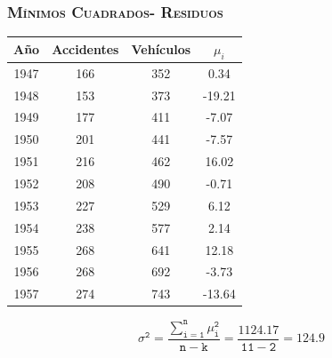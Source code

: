 \documentclass[16.5pt]{beamer}
\begin{document}
{
\begin{frame}
\frametitle{\textsc{Mínimos Cuadrados- Residuos}}
\hspace*{-5mm}
\vspace*{-5mm} 


\begin{center}
\begin{tabular}{| c |c |c|c|}
\hline%
  \textbf{Año} & \textbf{Accidentes} & \textbf{Vehículos}  & \textbf{$\mu_i$} 
 \tabularnewline
\hline
1947 & 166 &  352  & 0.34 \\
1948 & 153 & 373 & -19.21 \\
1949 & 177 & 411 & -7.07 \\
1950 & 201 & 441 & -7.57 \\
1951 & 216 & 462 & 16.02 \\
1952 & 208 & 490 & -0.71 \\
1953 & 227 & 529 & 6.12 \\
1954 & 238 & 577 & 2.14 \\
1955 & 268 & 641 & 12.18  \\
1956 & 268 & 692 & -3.73 \\
1957 & 274 & 743 & -13.64 \\
\hline
\end{tabular}
\end{center}
$$\mathtt{ \sigma^2 = \frac{\sum_{i=1}^n \mu_i^2}{n-k}= \frac{1124.17}{11-2}=124.9}$$


\end{frame}
}
\end{document}
